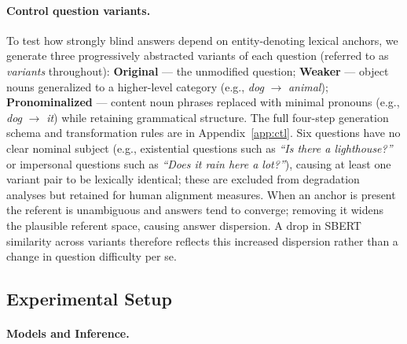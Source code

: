 \documentclass[letterpaper]{article}
\begin{document}
\paragraph{Control question variants.}
\label{sec:control}
To test how strongly blind answers depend on entity-denoting lexical anchors,
we generate three progressively abstracted variants of each question
(referred to as \emph{variants} throughout):
\textbf{Original} — the unmodified question;
\textbf{Weaker} — object nouns generalized to a higher-level category (e.g., \emph{dog} $\rightarrow$ \emph{animal});
\textbf{Pronominalized} — content noun phrases replaced with minimal pronouns (e.g., \emph{dog} $\rightarrow$ \emph{it}) while retaining grammatical structure.
The full four-step generation schema and transformation rules are in Appendix~\ref{app:ctl}.
Six questions have no clear nominal subject (e.g., existential questions such as \textit{``Is there a lighthouse?''} or impersonal questions such as \textit{``Does it rain here a lot?''}), causing at least one variant pair to be lexically identical; these are excluded from degradation analyses but retained for human alignment measures.
When an anchor is present the referent is unambiguous and answers tend to converge; removing it widens the plausible referent space, causing answer dispersion.
A drop in SBERT similarity across variants therefore reflects this increased dispersion rather than a change in question difficulty per se.


\subsection{Experimental Setup}
\label{sec:exp_setup}

\paragraph{Models and Inference.}
\end{document}
